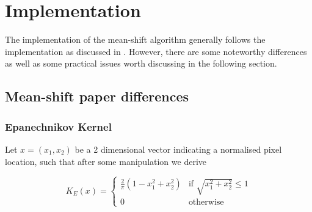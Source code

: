 \documentclass[a4paper,11pt]{article}
\begin{document}
	
















\section{Implementation}

The implementation of the mean-shift algorithm generally follows the implementation as discussed in \cite{mean_shift}. However, there are some noteworthy differences as well as some practical issues worth discussing in the following section.



\subsection{Mean-shift paper differences}

\subsubsection{Epanechnikov Kernel}



Let $x = (x_1,x_2)$ be a 2 dimensional vector indicating a normalised pixel location, such that after some manipulation we derive

\begin{equation}

\label{eq:epanechnikov_kernel2}

K_E(x) = \left\{ \begin{array}{cl}

  \frac{2}{\pi} (1-x_1^2 + x_2^2) & \textrm{if } \sqrt{x_1^2 + x_2^2} \leq 1 \\

  0 & \textrm{otherwise} \end{array}\right.

\end{equation}
\end{document}

